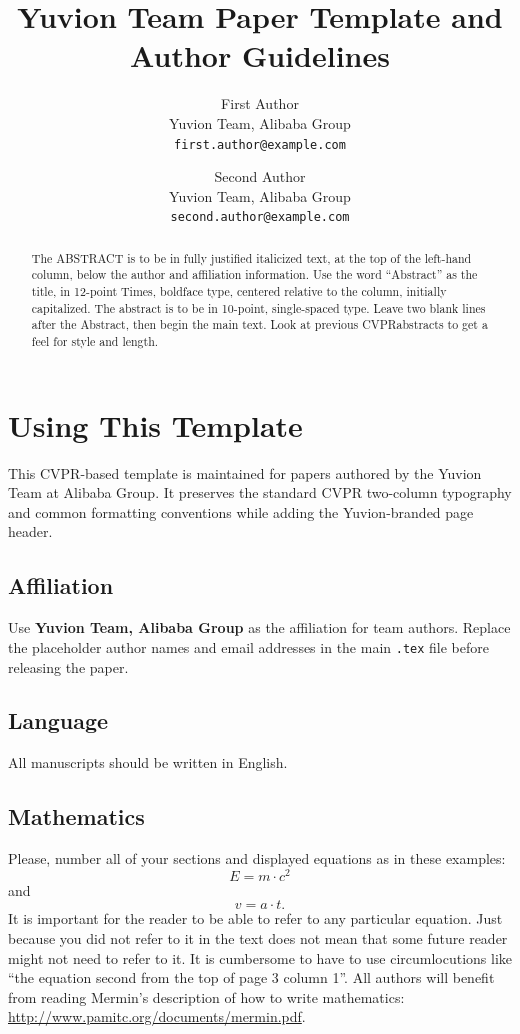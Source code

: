 \documentclass[10pt,twocolumn,letterpaper]{article}
\title{Yuvion Team Paper Template and Author Guidelines}
\author{First Author\\
Yuvion Team, Alibaba Group\\
{\tt\small first.author@example.com}
\and
Second Author\\
Yuvion Team, Alibaba Group\\
{\tt\small second.author@example.com}
}
\def\confName{CVPR}
\begin{document}
\maketitle
\pagestyle{yuvionheader}
\thispagestyle{yuvionheader}

\begin{abstract}
The ABSTRACT is to be in fully justified italicized text, at the top of the left-hand column, below the author and affiliation information.
Use the word ``Abstract'' as the title, in 12-point Times, boldface type, centered relative to the column, initially capitalized.
The abstract is to be in 10-point, single-spaced type.
Leave two blank lines after the Abstract, then begin the main text.
Look at previous \confName abstracts to get a feel for style and length.
\end{abstract}

\section{Using This Template}
\label{sec:intro}

This CVPR-based template is maintained for papers authored by the Yuvion Team at Alibaba Group. It preserves the standard CVPR two-column typography and common formatting conventions while adding the Yuvion-branded page header.

\subsection{Affiliation}

Use \textbf{Yuvion Team, Alibaba Group} as the affiliation for team authors. Replace the placeholder author names and email addresses in the main \texttt{.tex} file before releasing the paper.

\subsection{Language}

All manuscripts should be written in English.

\subsection{Mathematics}

Please, number all of your sections and displayed equations as in these examples:
\begin{equation}
  E = m\cdot c^2
  \label{eq:important}
\end{equation}
and
\begin{equation}
  v = a\cdot t.
  \label{eq:also-important}
\end{equation}
It is important for the reader to be able to refer to any particular equation.
Just because you did not refer to it in the text does not mean that some future reader might not need to refer to it.
It is cumbersome to have to use circumlocutions like ``the equation second from the top of page 3 column 1''.
All authors will benefit from reading Mermin's description of how to write mathematics:
\url{http://www.pamitc.org/documents/mermin.pdf}.
\end{document}
